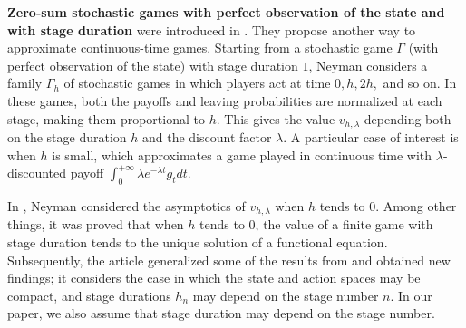 \documentclass[english,openary,12pt]{article}
\theoremstyle{definition}
\begin{document}
\textbf{Zero-sum stochastic games with perfect observation of the state 
and with stage duration} were introduced in \cite{Ney13}. They propose another way to approximate continuous-time games. Starting from a stochastic game $\Gamma$ (with perfect observation of the state) with stage duration $1$, Neyman considers a family $\Gamma_h$ of stochastic games in which players act at time $0, h, 2h,$ and so on. In these games, both the payoffs and leaving probabilities are normalized at each stage, making them proportional to $h$. This gives the value $v_{h,\lambda}$ depending both on the stage duration $h$ and the discount factor $\lambda$. A particular case of interest is when $h$ is small, which approximates a game played in continuous time with $\lambda$-discounted payoff $\int_0^{+\infty} \lambda e^{-\lambda t} g_t dt$.

In \cite{Ney13}, Neyman considered the asymptotics of $v_{h,\lambda}$ when $h$ tends to $0$. Among other things, it was proved that when $h$ tends to $0$, the value of a finite game with stage duration tends to the unique solution of a functional equation. Subsequently, the article \cite{SorVig16} generalized some of the results from \cite{Ney13} and obtained new findings; it considers the case in which the state and action spaces may be compact, and stage durations $h_n$ may depend on the stage number $n$. In our paper, we also assume that stage duration may depend on the stage number.
\end{document}
